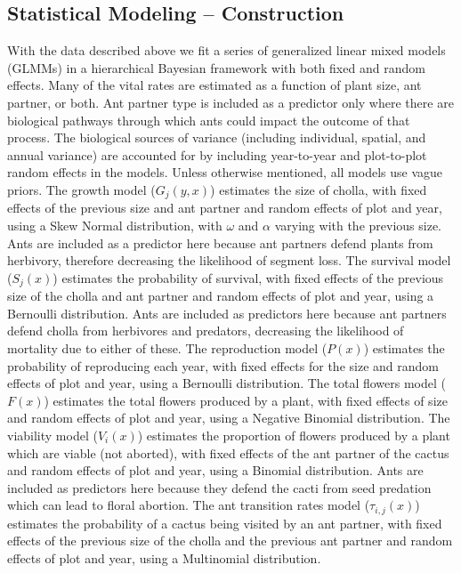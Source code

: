 \documentclass[12pt,a4paper]{article}
\begin{document}
	\subsection*{Statistical Modeling -- Construction}
With the data described above we fit a series of generalized linear mixed models (GLMMs) in a hierarchical Bayesian framework with both fixed and random effects.
Many of the vital rates are estimated as a function of plant size, ant partner, or both.
Ant partner type is included as a predictor only where there are biological pathways through which ants could impact the outcome of that process. 
The biological sources of variance (including individual, spatial, and annual variance) are accounted for by including year-to-year and plot-to-plot random effects in the models. 
Unless otherwise mentioned, all models use vague priors. 
The growth model ($G_j(y,x)$) estimates the size of cholla, with fixed effects of the previous size and ant partner and random effects of plot and year, using a Skew Normal distribution, with $\omega$ and $\alpha$ varying with the previous size. 
Ants are included as a predictor here because ant partners defend plants from herbivory, therefore decreasing the likelihood of segment loss.
The survival model ($S_j(x)$) estimates the probability of survival, with fixed effects of the previous size of the cholla and ant partner and random effects of plot and year, using a Bernoulli distribution. 
Ants are included as predictors here because ant partners defend cholla from herbivores and predators, decreasing the likelihood of mortality due to either of these. 
The reproduction model ($P(x)$) estimates the probability of reproducing each year, with fixed effects for the size and random effects of plot and year, using a Bernoulli distribution. 
The total flowers model ($F(x)$) estimates the total flowers produced by a plant, with fixed effects of size and random effects of plot and year, using a Negative Binomial distribution. 
The viability model ($V_i(x)$) estimates the proportion of flowers produced by a plant which are viable (not aborted), with fixed effects of the ant partner of the cactus and random effects of plot and year, using a Binomial distribution.
Ants are included as predictors here because they defend the cacti from seed predation which can lead to floral abortion. 
The ant transition rates model ($\tau_{i,j}(x)$) estimates the probability of a cactus being visited by an ant partner, with fixed effects of the previous size of the cholla and the previous ant partner and random effects of plot and year, using a Multinomial distribution.  
\end{document}
